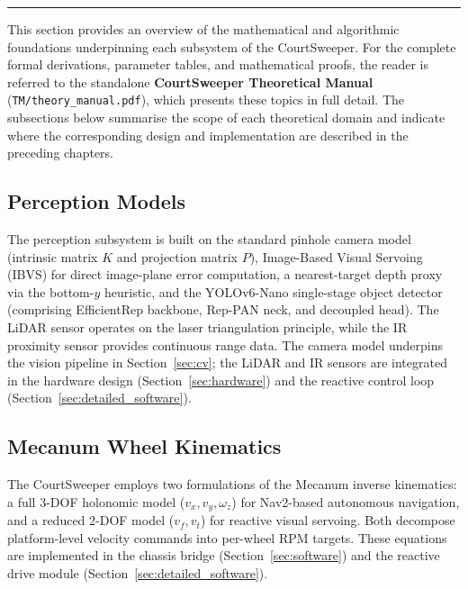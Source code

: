 \label{sec:theory}

\textcolor{gray}{\rule{\linewidth}{3pt}}

This section provides an overview of the mathematical and algorithmic foundations underpinning each subsystem of the CourtSweeper. For the complete formal derivations, parameter tables, and mathematical proofs, the reader is referred to the standalone \textbf{CourtSweeper Theoretical Manual} (\texttt{TM/theory\_manual.pdf}), which presents these topics in full detail. The subsections below summarise the scope of each theoretical domain and indicate where the corresponding design and implementation are described in the preceding chapters.

\subsection{Perception Models}
\label{sec:theory_perception}

The perception subsystem is built on the standard pinhole camera model (intrinsic matrix $K$ and projection matrix $P$), Image-Based Visual Servoing (IBVS) for direct image-plane error computation, a nearest-target depth proxy via the bottom-$y$ heuristic, and the YOLOv6-Nano single-stage object detector (comprising EfficientRep backbone, Rep-PAN neck, and decoupled head). The LiDAR sensor operates on the laser triangulation principle, while the IR proximity sensor provides continuous range data. The camera model underpins the vision pipeline in Section~\ref{sec:cv}; the LiDAR and IR sensors are integrated in the hardware design (Section~\ref{sec:hardware}) and the reactive control loop (Section~\ref{sec:detailed_software}).

\subsection{Mecanum Wheel Kinematics}
\label{sec:theory_kinematics}

The CourtSweeper employs two formulations of the Mecanum inverse kinematics: a full 3-DOF holonomic model ($v_x, v_y, \omega_z$) for Nav2-based autonomous navigation, and a reduced 2-DOF model ($v_f, v_t$) for reactive visual servoing. Both decompose platform-level velocity commands into per-wheel RPM targets. These equations are implemented in the chassis bridge (Section~\ref{sec:software}) and the reactive drive module (Section~\ref{sec:detailed_software}).

